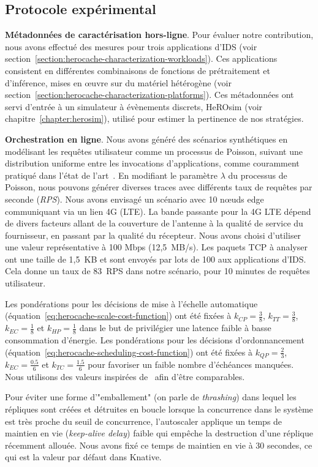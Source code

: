 \subsection{Protocole expérimental}

\textbf{Métadonnées de caractérisation hors-ligne}. Pour évaluer notre contribution, nous avons effectué des mesures pour trois applications d'IDS (voir section~\ref{section:herocache-characterization-workloads}). Ces applications consistent en différentes combinaisons de fonctions de prétraitement et d'inférence, mises en œuvre sur du matériel hétérogène (voir section~\ref{section:herocache-characterization-platforms}). Ces métadonnées ont servi d'entrée à un simulateur à évènements discrets, HeROsim (voir chapitre~\ref{chapter:herosim}), utilisé pour estimer la pertinence de nos stratégies.

\textbf{Orchestration en ligne}. Nous avons généré des scénarios synthétiques en modélisant les requêtes utilisateur comme un processus de Poisson, suivant une distribution uniforme entre les invocations d'applications, comme couramment pratiqué dans l'état de l'art~\cite{9928755}. En modifiant le paramètre $\lambda$ du processus de Poisson, nous pouvons générer diverses traces avec différents taux de requêtes par seconde (\textit{RPS}). Nous avons envisagé un scénario avec 10 nœuds edge communiquant via un lien 4G (LTE). La bande passante pour la 4G LTE dépend de divers facteurs allant de la couverture de l'antenne à la qualité de service du fournisseur, en passant par la qualité du récepteur. Nous avons choisi d'utiliser une valeur représentative à 100 Mbps (12,5~MB/s). Les paquets TCP à analyser ont une taille de 1,5~KB et sont envoyés par lots de 100 aux applications d'IDS. Cela donne un taux de 83~RPS dans notre scénario, pour 10 minutes de requêtes utilisateur.

Les pondérations pour les décisions de mise à l'échelle automatique (équation~\ref{eq:herocache-scale-cost-function}) ont été fixées à $k_{CP} = \frac{3}{8}$, $k_{TT} = \frac{3}{8}$, $k_{EC} = \frac{1}{8}$ et $k_{HP} = \frac{1}{8}$ dans le but de privilégier une latence faible à basse consommation d'énergie. Les pondérations pour les décisions d'ordonnancement (équation~\ref{eq:herocache-scheduling-cost-function}) ont été fixées à $k_{QP} = \frac{2}{3}$, $k_{EC} = \frac{0.5}{6}$ et $k_{TC} = \frac{1.5}{6}$ pour favoriser un faible nombre d'échéances manquées. Nous utilisons des valeurs inspirées de~\cite{herofake} afin d'être comparables.

Pour éviter une forme d'"emballement" (on parle de \textit{thrashing}) dans lequel les répliques sont créées et détruites en boucle lorsque la concurrence dans le système est très proche du seuil de concurrence, l'autoscaler applique un temps de maintien en vie (\textit{keep-alive delay}) faible qui empêche la destruction d'une réplique récemment allouée. Nous avons fixé ce temps de maintien en vie à 30 secondes, ce qui est la valeur par défaut dans Knative.

